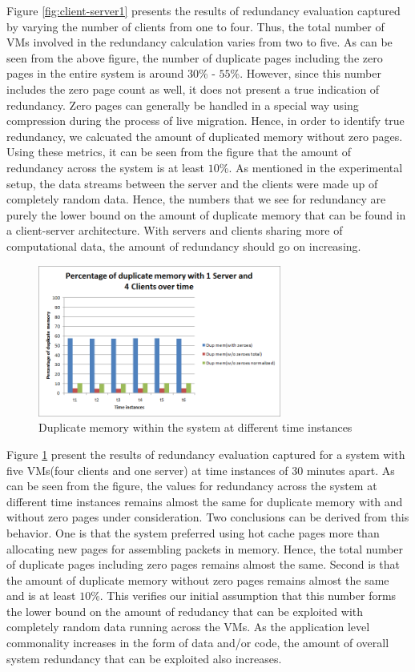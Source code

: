 \documentclass{acm_proc_article-sp}
\begin{document}
Figure \ref{fig:client-server1} presents the results of redundancy evaluation captured by varying the number of clients from one to four. Thus, the total number of VMs involved in the redundancy calculation varies from two to five. As can be seen from the above figure, the number of duplicate pages including the zero pages in the entire system is around $30$\% - $55$\%.	However, since this number includes the zero page count as well, it does not present a true indication of redundancy. Zero pages can generally be handled in a special way using compression during the process of live migration. Hence, in order to identify true redundancy, we calcuated the amount of duplicated memory without zero pages. Using these metrics, it can be seen from the figure that the amount of redundancy across the system is at least $10$\%. As mentioned in the experimental setup, the data streams between the server and the clients were made up of completely random data. Hence, the numbers that we see for redundancy are purely the lower bound on the amount of duplicate memory that can be found in a client-server architecture. With servers and clients sharing more of computational data, the amount of redundancy should go on increasing.

\begin{figure}[htbp]
\centering
        \includegraphics[width=8cm]{images/client-server2.png}
    \caption{Duplicate memory within the system at different time instances}
    \label{fig:client-server2}
\end{figure}

Figure \ref{fig:client-server2} present the results of redundancy evaluation captured for a system with five VMs(four clients and one server) at time instances of 30 minutes apart. As can be seen from the figure, the values for redundancy across the system at different time instances remains almost the same for duplicate memory with and without zero pages under consideration. Two conclusions can be derived from this behavior. One is that the system preferred using hot cache pages more than allocating new pages for assembling packets in memory. Hence, the total number of duplicate pages including zero pages remains almost the same. Second is that the amount of duplicate memory without zero pages remains almost the same and is at least $10$\%. This verifies our initial assumption that this number forms the lower bound on the amount of redudancy that can be exploited with completely random data running across the VMs. As the application level commonality increases in the form of data and/or code, the amount of overall system redundancy that can be exploited also increases.
\end{document}
